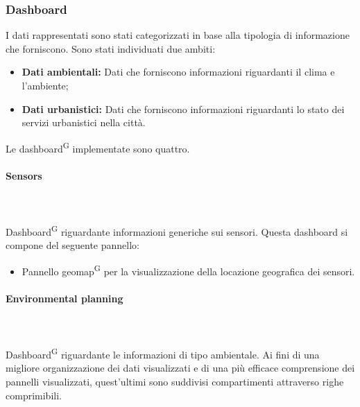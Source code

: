 \documentclass[8pt]{article}
\newcommand{\glossterm}[1]{#1\textsuperscript{G}} %
\newcommand{\subsubsubsection}[1]{\paragraph{#1}\mbox{}\\\\}
\begin{document}
\subsubsection{Dashboard}
I dati rappresentati sono stati categorizzati in base alla tipologia di informazione che forniscono. Sono stati individuati due ambiti:
\begin{itemize}
    \item \textbf{Dati ambientali:} Dati che forniscono informazioni riguardanti il clima e l'ambiente;
    \item \textbf{Dati urbanistici:} Dati che forniscono informazioni riguardanti lo stato dei servizi urbanistici nella città.
\end{itemize}
Le \glossterm{dashboard} implementate sono quattro.
\subsubsubsection{Sensors} 
\glossterm{Dashboard} riguardante informazioni generiche sui sensori. Questa dashboard si compone del seguente pannello:
\begin{itemize}
    \item Pannello \glossterm{geomap} per la visualizzazione della locazione geografica dei sensori.
\end{itemize}
\subsubsubsection{Environmental planning} 
\glossterm{Dashboard} riguardante le informazioni di tipo ambientale.
Ai fini di una migliore organizzazione dei dati visualizzati e di una più efficace comprensione dei pannelli visualizzati, quest'ultimi sono suddivisi compartimenti attraverso righe comprimibili.
\end{document}
